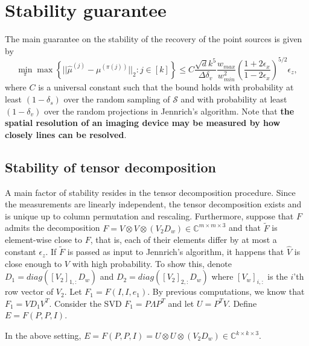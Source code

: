 \section{Stability guarantee}
The main guarantee on the stability of the recovery of the point sources is given by $$\min_\pi\max\left\{||\widehat{\mu}^{(j)}-\mu^{(\pi(j))}||_2:j\in[k]\right\}\leq C\frac{\sqrt{d}k^5}{\Delta\delta_v}\frac{w_{max}}{w_{min}^2}\left(\frac{1+2\epsilon_x}{1-2\epsilon_x}\right)^{5/2}\epsilon_z,$$ where $C$ is a universal constant such that the bound holds with probability at least $(1-\delta_s)$ over the random sampling of $\mathcal{S}$ and with probability at least $(1-\delta_v)$ over the random projections in Jennrich's algorithm. Note that {\bf the spatial resolution of an imaging device may be measured by how closely lines can be resolved}.
\subsection{Stability of tensor decomposition}
A main factor of stability resides in the tensor decomposition procedure. Since the measurements are linearly independent, the tensor decomposition exists and is unique up to column permutation and rescaling. Furthermore, suppose that $F$ admits the decomposition $F=V\otimes V\otimes (V_2D_w)\in\mathbb{C}^{m\times m\times 3}$ and that $\tilde{F}$ is element-wise close to $F$, that is, each of their elements differ by at most a constant $\epsilon_z$. If $\tilde{F}$ is passed as input to Jennrich's algorithm, it happens that $\widehat{V}$ is close enough to $V$ with high probability. To show this, denote $D_1=diag([V_2]_{1,:}D_w)$ and $D_2=diag([V_2]_{2,:}D_w)$ where $[V_w]_{i,:}$ is the $i$'th row vector of $V_2$. Let $F_1=F(I,I,e_1)$. By previous computations, we know that $F_1=VD_1V^T$. Consider the SVD $F_1=P\Lambda P^T$ and let $U=P^TV$. Define $E=F(P,P,I)$.
\begin{fact}
    In the above setting, $E=F(P,P,I)=U\otimes U\otimes (V_2D_w)\in\mathbb{C}^{k\times k\times 3}$.
\end{fact}

